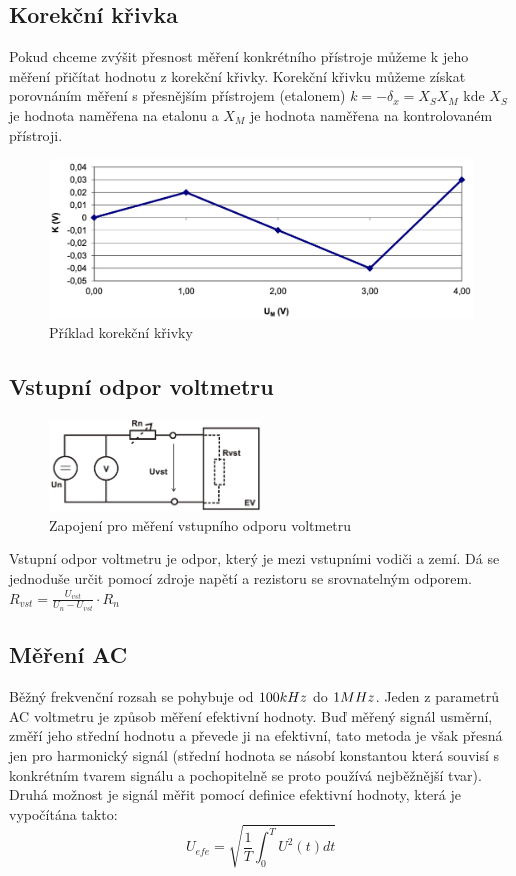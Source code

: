 \documentclass{article}
\begin{document}
\subsection*{Korekční křivka}
Pokud chceme zvýšit přesnost měření konkrétního přístroje můžeme k jeho měření přičítat hodnotu z korekční křivky.
Korekční křivku můžeme získat porovnáním měření s přesnějším přístrojem (etalonem) \(k = -\delta_x = X_S X_M\) kde \(X_S\) je hodnota naměřena na etalonu a \(X_M\) je hodnota naměřena na kontrolovaném přístroji.
\begin{figure}[H]
    \includegraphics[width=\textwidth]{obrazky/korekcni_krivka.png}
    \caption{\label{korek_krivka}Příklad korekční křivky}
\end{figure}

\subsection*{Vstupní odpor voltmetru}
\begin{figure}
    \vspace{-10mm}
    \includegraphics[width=0.5\textwidth]{obrazky/vstup_odpor.png}
    \caption{\label{vstupni_odpor}Zapojení pro měření vstupního odporu voltmetru}
\end{figure}
Vstupní odpor voltmetru je odpor, který je mezi vstupními vodiči a zemí.
Dá se jednoduše určit pomocí zdroje napětí a rezistoru se srovnatelným odporem.
\(R_{vst}=\frac{U_{vst}}{U_{n}-U_{vst}}\cdot R_n\)

\subsection{Měření AC}
Běžný frekvenční rozsah se pohybuje od \(100\-kHz\) do \(1\-MHz\).
Jeden z parametrů AC voltmetru je způsob měření efektivní hodnoty.
Buď měřený signál usměrní, změří jeho střední hodnotu a převede ji na efektivní, tato metoda je však přesná jen pro harmonický signál (střední hodnota se násobí konstantou která souvisí s konkrétním tvarem signálu a pochopitelně se proto používá nejběžnější tvar).
Druhá možnost je signál měřit pomocí definice efektivní hodnoty, která je vypočítána takto:
\begin{equation}
    U_{efe} = \sqrt{\frac{1}{T}\int_{0}^{T}U^2(t)dt}
    \label{proud_kolektoru}
\end{equation}
\end{document}
